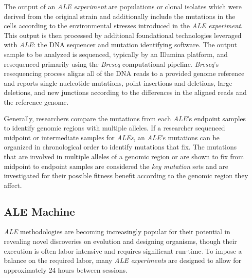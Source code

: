 \documentclass[12pt,final,masters,chapterheads]{ucsd}  %
\begin{document}
The output of an \textit{ALE experiment} are populations or clonal isolates which were derived from the original strain and additionally include the mutations in the cells according to the environmental stresses introduced in the \textit{ALE experiment}. This output is then processed by additional foundational technologies leveraged with \textit{ALE}: the DNA sequencer and mutation identifying software. The output sample to be analyzed is sequenced, typically by an Illumina platform, and resequenced primarily using the \textit{Breseq} computational pipeline\cite{breseq_paper}. \textit{Breseq}'s resequencing process aligns all of the DNA reads to a provided genome reference and reports single-nucleotide mutations, point insertions and deletions, large deletions, and new junctions according to the differences in the aligned reads and the reference genome.

Generally, researchers compare the mutations from each \textit{ALE}'s endpoint samples to identify genomic regions with multiple alleles. If a researcher sequenced midpoint or intermediate samples for \textit{ALEs}, an \textit{ALE}'s mutations can be organized in chronological order to identify mutations that fix. The mutations that are involved in multiple alleles of a genomic region or are shown to fix from midpoint to endpoint samples are considered the \textit{key mutation} sets and are investigated for their possible fitness benefit according to the genomic region they affect.


\subsection{ALE Machine}

\textit{ALE} methodologies are becoming increasingly popular for their potential in revealing novel discoveries on evolution and designing organisms, though their execution is often labor intensive and requires significant run-time. To impose a balance on the required labor, many \textit{ALE experiments} are designed to allow for approximately 24 hours between sessions.
\end{document}
